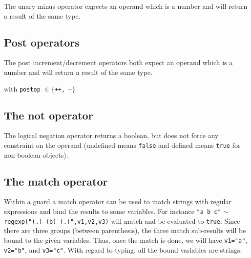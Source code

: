 \documentclass[11pt]{report}
\begin{document}
The unary minus operator expects an operand which is a number and will return a result of the same type.

\begin{center}
\DP
\end{center}

\subsection{Post operators}

The post increment/decrement operators both expect an operand which is a number and will return a result of the same type.

\begin{center}
\DP
\end{center}
\begin{center}with  \texttt{postop} $\in \{$\texttt{++, --}$\}$\end{center}

\subsection{The not operator}

The logical negation operator returns a boolean, but does not force any constraint on the operand (undefined means \texttt{false} and defined means \texttt{true} for non-boolean objects).

\begin{center}
\DP
\end{center}

\subsection{The match operator}

Within a guard a match operator can be used to match strings with regular expressions and bind the results to some variables. For instance \texttt{"a b c"} $\sim$ \texttt{regexp("(.) (b) (.)",v1,v2,v3)} will match and be evaluated to \texttt{true}. Since there are three groups (between parenthesis), the three match sub-results will be bound to the given variables. Thus, once the match is done, we will have \texttt{v1="a"}, \texttt{v2="b"}, and \texttt{v3="c"}. With regard to typing, all the bound variables are strings.
\end{document}
